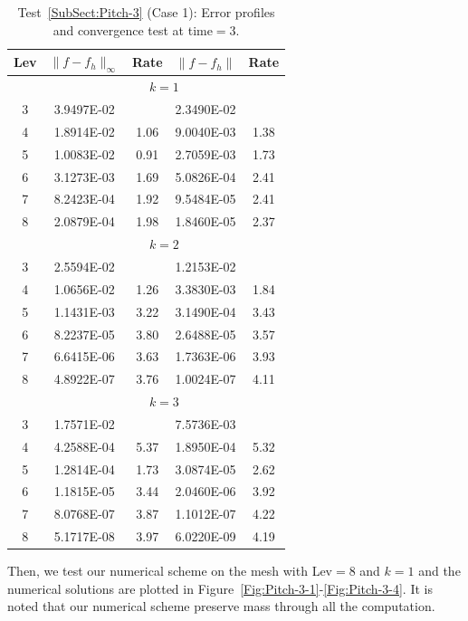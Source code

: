 \documentclass[preprint,11pt]{elsarticle}
\begin{document}
\begin{table}[H]
\caption{Test~\ref{SubSect:Pitch-3} (Case 1): Error profiles and convergence test at time$=3$.}\label{Tab:pitch_rad}
\centering
\begin{tabular}{c|cc|cc}	\hline\hline
Lev & $\|f-f_h\|_{\infty}$ & Rate & $\|f-f_h\|$ & Rate \\ \hline		
&\multicolumn{4}{c}{$k=1$}\\ \hline
3	&3.9497E-02	&	&2.3490E-02	& \\
4	&1.8914E-02	&1.06	&9.0040E-03	&1.38\\
5	&1.0083E-02	&0.91	&2.7059E-03	&1.73\\
6	&3.1273E-03	&1.69	&5.0826E-04	&2.41\\
7	&8.2423E-04	&1.92	&9.5484E-05	&2.41\\
8	&2.0879E-04	&1.98	&1.8460E-05	&2.37\\ \hline
	&\multicolumn{4}{c}{$k=2$}\\ \hline			
3	&2.5594E-02	&	&1.2153E-02	& \\
4	&1.0656E-02	&1.26	&3.3830E-03	&1.84\\
5	&1.1431E-03	&3.22	&3.1490E-04	&3.43\\
6	&8.2237E-05	&3.80	&2.6488E-05	&3.57\\
7	&6.6415E-06	&3.63	&1.7363E-06	&3.93\\
8	&4.8922E-07	&3.76	&1.0024E-07	&4.11\\ \hline
		&\multicolumn{4}{c}{$k=3$}\\ \hline		
3	&1.7571E-02	&	&7.5736E-03	& \\
4	&4.2588E-04	&5.37	&1.8950E-04	&5.32\\
5	&1.2814E-04	&1.73	&3.0874E-05	&2.62\\
6	&1.1815E-05	&3.44	&2.0460E-06	&3.92\\
7	&8.0768E-07	&3.87	&1.1012E-07	&4.22\\
8	&5.1717E-08	&3.97	&6.0220E-09	&4.19\\ \hline\hline
\end{tabular}
\end{table}


Then, we test our numerical scheme on the mesh with Lev$=8$ and $k=1$ and the numerical solutions are plotted in Figure~\ref{Fig:Pitch-3-1}-\ref{Fig:Pitch-3-4}. It is noted that our numerical scheme preserve mass through all the computation.
\end{document}
